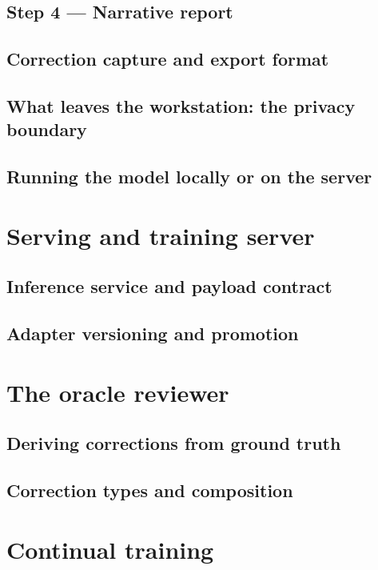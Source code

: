 \subsection{Step 4 --- Narrative report}
\subsection{Correction capture and export format}
\subsection{What leaves the workstation: the privacy boundary}
\subsection{Running the model locally or on the server}

\section{Serving and training server}\label{sec:server}
\subsection{Inference service and payload contract}
\subsection{Adapter versioning and promotion}

\section{The oracle reviewer}\label{sec:oracle}
\subsection{Deriving corrections from ground truth}
\subsection{Correction types and composition}

\section{Continual training}\label{sec:training}
